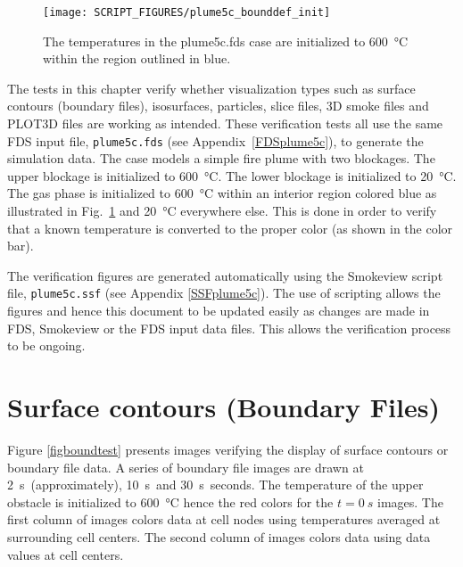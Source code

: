 \documentclass[11pt,twoside]{book}
\begin{document}
\begin{figure}[\figoptions]
\begin{center}
\texttt{[image: SCRIPT\_FIGURES/plume5c\_bounddef\_init]}
\end{center}
\caption{The temperatures in the plume5c.fds case are initialized to
\SI{600}{\degreeCelsius} within the region outlined in blue.}
\label{figbounddef}%
\end{figure}

The tests in this chapter verify whether visualization types such
as surface contours (boundary files), isosurfaces, particles,
slice files, 3D smoke files and PLOT3D files are working as
intended.  These verification tests all use the same FDS input
file, {\tt plume5c.fds} (see Appendix~\ref{FDSplume5c}), to
generate the simulation data.  The case models a simple fire plume
with two blockages.  The upper blockage is initialized to
\SI{600}{\degreeCelsius}.   The lower blockage is initialized to
\SI{20}{\degreeCelsius}.  The gas phase is initialized to
\SI{600}{\degreeCelsius} within an interior region colored blue as
illustrated in Fig.~\ref{figbounddef} and \SI{20}{\degreeCelsius}
everywhere else.  This is done in order to verify that a known
temperature is converted to the proper color (as shown in the
color bar).

The verification figures are generated automatically using the Smokeview
script file, {\tt plume5c.ssf} (see Appendix \ref{SSFplume5c}).  The use
of scripting allows the figures and hence this document to be updated
easily as changes are made in FDS, Smokeview or the FDS input data files.
This allows the verification process to be ongoing.

\clearpage

\section{Surface contours (Boundary Files)}
Figure \ref{figboundtest} presents images verifying the display of surface
contours or boundary file data. A series of boundary file images are drawn
at \SI{2}{s}\ (approximately), \SI{10}{s}\ and \SI{30}{s}\ seconds.
The temperature of the upper obstacle is initialized to \SI{600}{\degreeCelsius}
hence the red colors for the $t=\SI{0}{s}$ images. The first column of images
colors data at cell nodes using temperatures averaged at surrounding cell centers.
The second column of images colors data using data values at cell centers.
\end{document}

